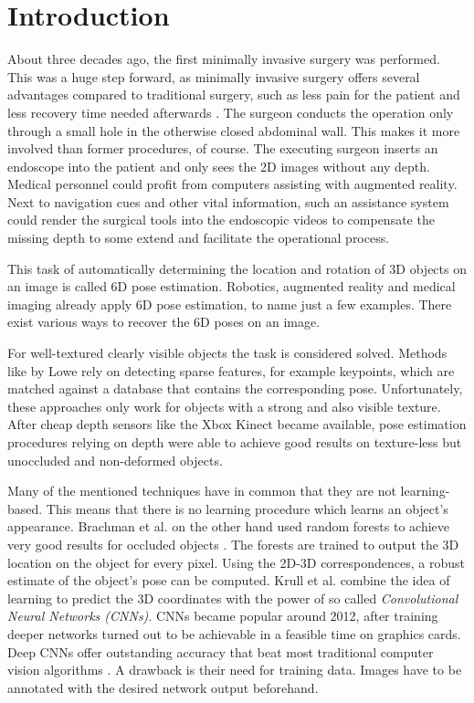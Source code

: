 \chapter{Introduction}

About three decades ago, the first minimally invasive surgery was performed. This was a huge step forward, as minimally invasive surgery offers several advantages compared to traditional surgery, such as less pain for the patient and less recovery time needed afterwards \cite{minimallyinvasive}. The surgeon conducts the operation only through a small hole in the otherwise closed abdominal wall. This makes it more involved than former procedures, of course. The executing surgeon inserts an endoscope into the patient and only sees the 2D images without any depth. Medical personnel could profit from computers assisting with augmented reality. Next to navigation cues and other vital information, such an assistance system could render the surgical tools into the  endoscopic videos to compensate the missing depth to some extend and facilitate the operational process. \

This task of automatically determining the location and rotation of 3D objects on an image is called 6D pose estimation. Robotics, augmented reality and medical imaging already apply 6D pose estimation, to name just a few examples. There exist various ways to recover the 6D poses on an image. 

For well-textured clearly visible objects the task is considered solved. Methods like \cite{dglowe1} by Lowe \etal rely on detecting sparse features, for example keypoints, which are matched against a database that contains the corresponding pose.
Unfortunately, these approaches only work for objects with a strong and also visible texture. After cheap depth sensors like the Xbox Kinect became available, pose estimation procedures relying on depth were able to achieve good results on texture-less but unoccluded and non-deformed objects. 

Many of the mentioned techniques have in common that they are not learning-based. This means that there is no learning procedure which learns an object's appearance. Brachman et al. on the other hand used random forests  to achieve very good results for occluded objects \cite{brachmann1}. The forests are trained to output the 3D location on the object for every pixel. Using the 2D-3D correspondences, a robust estimate of the object's pose can be computed. Krull et al. \cite{akrull} combine the idea of learning to predict the 3D coordinates  with the power of so called \textit{Convolutional Neural Networks (CNNs)}. CNNs became popular around 2012, after training deeper networks turned out to be achievable in a feasible time on graphics cards. Deep CNNs offer outstanding accuracy that beat most traditional computer vision algorithms \cite{ylecun}. A drawback is their need for training data. Images have to be annotated with the desired network output beforehand.

